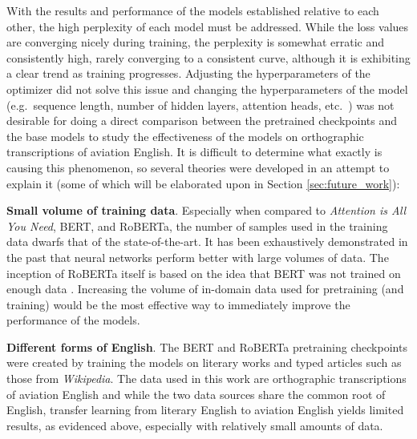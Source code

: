 \documentclass[12pt]{article}
\begin{document}
With the results and performance of the models established relative to each other, the high perplexity of each model must be addressed. While the loss
values are converging nicely during training, the perplexity is somewhat erratic and consistently high, rarely converging to a consistent curve,
although it is exhibiting a clear trend as training progresses. Adjusting the hyperparameters of the optimizer did not solve this issue and changing
the hyperparameters of the model (e.g.~sequence length, number of hidden layers, attention heads, etc.~) was not desirable for doing a direct
comparison between the pretrained checkpoints and the base models to study the effectiveness of the models on orthographic transcriptions of aviation
English. It is difficult to determine what exactly is causing this phenomenon, so several theories were developed in an attempt to explain it (some
of which will be elaborated upon in Section \ref{sec:future_work}):

\textbf{Small volume of training data}. Especially when compared to \textit{Attention is All You Need}, BERT, and RoBERTa,
\cite{vaswani_attention_2017,devlin_bert_2019,liu_roberta_2019} the number of samples used in the training data dwarfs that of the state-of-the-art.
It has been exhaustively demonstrated in the past that neural networks perform better with large volumes of data. The inception of RoBERTa itself is
based on the idea that BERT was not trained on enough data \cite{liu_roberta_2019}. Increasing the volume of in-domain data used for pretraining
(and training) would be the most effective way to immediately improve the performance of the models.

\textbf{Different forms of English}. The BERT and RoBERTa pretraining checkpoints were created by training the models on literary works and typed
articles such as those from \textit{Wikipedia}. The data used in this work are orthographic transcriptions of aviation English and while the two data
sources share the common root of English, transfer learning from literary English to aviation English yields limited results, as evidenced above,
especially with relatively small amounts of data.
\end{document}
